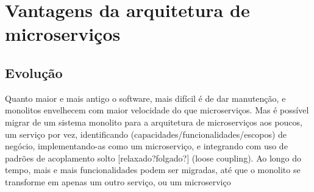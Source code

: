 
\section{Vantagens da arquitetura de microserviços}

\subsection{Evolução}

Quanto maior e mais antigo o software, mais difícil é de dar manutenção, e monolitos envelhecem com maior velocidade do que microserviços. Mas é possível migrar de um sistema monolito para a arquitetura de microserviços aos poucos, um serviço por vez, identificando (capacidades/funcionalidades/escopos) de negócio, implementando-as como um microserviço, e integrando com uso de padrões de acoplamento solto [relaxado?folgado?] (loose coupling). Ao longo do tempo, mais e mais funcionalidades podem ser migradas, até que o monolito se transforme em apenas um outro serviço, ou um microserviço

